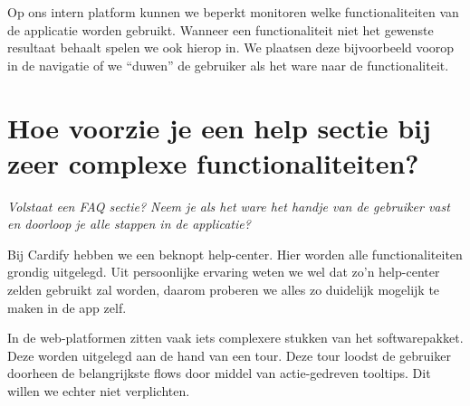Op ons intern platform kunnen we beperkt monitoren welke functionaliteiten van de applicatie worden gebruikt. Wanneer een functionaliteit niet het gewenste resultaat behaalt spelen we ook hierop in. We plaatsen deze bijvoorbeeld voorop in de navigatie of we ``duwen'' de gebruiker als het ware naar de functionaliteit.

\section[Vraag 5]{Hoe voorzie je een help sectie bij zeer complexe functionaliteiten?}

\textit{Volstaat een FAQ sectie? Neem je als het ware het handje van de gebruiker vast en doorloop je alle stappen in de applicatie?}

Bij Cardify hebben we een beknopt help-center. Hier worden alle functionaliteiten grondig uitgelegd. Uit persoonlijke ervaring weten we wel dat zo'n help-center zelden gebruikt zal worden, daarom proberen we alles zo duidelijk mogelijk te maken in de app zelf.

In de web-platformen zitten vaak iets complexere stukken van het softwarepakket. Deze worden uitgelegd aan de hand van een tour. Deze tour loodst de gebruiker doorheen de belangrijkste flows door middel van actie-gedreven tooltips. Dit willen we echter niet verplichten.
